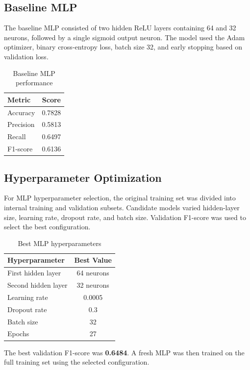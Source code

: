\documentclass[10pt,a4paper]{article}
\begin{document}
\subsection{Baseline MLP}

The baseline MLP consisted of two hidden ReLU layers containing 64 and 32 neurons, followed by a single sigmoid output neuron. The model used the Adam optimizer, binary cross-entropy loss, batch size 32, and early stopping based on validation loss.

\begin{table}[H]
\centering
\caption{Baseline MLP performance}
\begin{tabular}{lc}
\toprule
\textbf{Metric} & \textbf{Score} \\
\midrule
Accuracy  & 0.7828 \\
Precision & 0.5813 \\
Recall    & 0.6497 \\
F1-score  & 0.6136 \\
\bottomrule
\end{tabular}
\end{table}

\subsection{Hyperparameter Optimization}

For MLP hyperparameter selection, the original training set was divided into internal training and validation subsets. Candidate models varied hidden-layer size, learning rate, dropout rate, and batch size. Validation F1-score was used to select the best configuration.

\begin{table}[H]
\centering
\caption{Best MLP hyperparameters}
\begin{tabular}{lc}
\toprule
\textbf{Hyperparameter} & \textbf{Best Value} \\
\midrule
First hidden layer  & 64 neurons \\
Second hidden layer & 32 neurons \\
Learning rate       & 0.0005 \\
Dropout rate        & 0.3 \\
Batch size          & 32 \\
Epochs              & 27 \\
\bottomrule
\end{tabular}
\end{table}

The best validation F1-score was \textbf{0.6484}. A fresh MLP was then trained on the full training set using the selected configuration.
\end{document}
